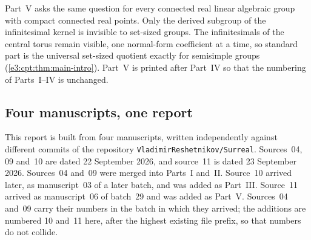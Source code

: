 \documentclass[11pt,letterpaper]{article}
\numberwithin{equation}{section}
\theoremstyle{definition}
\theoremstyle{remark}
\newcommand{\repo}{\texttt{VladimirReshetnikov/Surreal}}
\begin{document}
Part~V asks the same question for every connected real linear algebraic group
with compact connected real points. Only the derived subgroup of the
infinitesimal kernel is invisible to set-sized groups. The infinitesimals of the
central torus remain visible, one normal-form coefficient at a time, so standard
part is the universal set-sized quotient exactly for semisimple groups
(\cref{e3:cpt:thm:main-intro}). Part~V is printed after Part~IV so that the
numbering of Parts~I--IV is unchanged.

\subsection{Four manuscripts, one report}\label{e3:sub:provenance}

This report is built from four manuscripts, written independently against
different commits of the repository \repo. Sources~04, 09 and~10 are dated
22 September 2026, and source~11 is dated 23 September 2026. Sources~04 and~09
were merged into Parts~I and~II. Source~10 arrived later, as manuscript~03 of a
later batch, and was added as Part~III. Source~11 arrived as manuscript~06 of
batch~29 and was added as Part~V. Sources~04 and~09 carry their numbers in the
batch in which they arrived; the additions are numbered 10 and~11 here, after
the highest existing file prefix, so that numbers do not collide.
\end{document}
